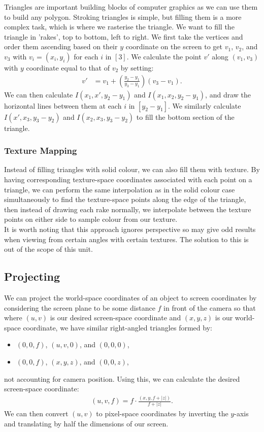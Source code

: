 Triangles are important building blocks of computer graphics as we can use them to build
any polygon. Stroking triangles is simple, but filling them is a more complex task, which
is where we rasterise the triangle.
\newpage
\noindent
We want to fill the triangle in 'rakes', top to bottom, left to right. We first take
the vertices and order them ascending based on their $y$ coordinate on the screen
to get $v_1$, $v_2$, and $v_3$ with $v_i = (x_i, y_i)$ for each $i$ in $[3]$. 
We calculate the point $v'$ along $(v_1, v_3)$ with $y$ coordinate equal to that 
of $v_2$ by setting: \begin{align*}
    v' &= v_1 + \left( \frac{y_2 - y_1}{y_3 - y_1} \right)(v_3 - v_1).
\end{align*} We can then calculate $I(x_1, x', y_2 - y_1)$ and $I(x_1, x_2, y_2 - y_1)$,
and draw the horizontal lines between them at each $i$ in $[y_2 - y_1]$. We similarly
calculate $I(x', x_3, y_3 - y_2)$ and $I(x_2, x_3, y_3 - y_2)$ to fill the bottom
section of the triangle.

\subsubsection{Texture Mapping}

Instead of filling triangles with solid colour, we can also fill them with texture.
By having corresponding texture-space coordinates associated with each point on a
triangle, we can perform the same interpolation as in the solid colour case
simultaneously to find the texture-space points along the edge of the triangle,
then instead of drawing each rake normally, we interpolate between the texture
points on either side to sample colour from our texture.
\\[\baselineskip]
It is worth noting that this approach ignores perspective so may give odd results
when viewing from certain angles with certain textures. The solution to this is
out of the scope of this unit.

\subsection{Projecting}

We can project the world-space coordinates of an object to screen coordinates
by considering the screen plane to be some distance $f$ in front of the
camera so that where $(u, v)$ is our desired screen-space coordinate and $(x, y, z)$ is
our world-space coordinate, we have similar right-angled triangles formed by: 
\begin{itemize}
    \item $(0, 0, f)$, $(u, v, 0)$, and $(0, 0, 0)$,
    \item $(0, 0, f)$, $(x, y, z)$, and $(0, 0, z)$,
\end{itemize} not accounting for camera position.
Using this, we can calculate the desired screen-space coordinate: 
\begin{align*}
    (u, v, f) = f \cdot \frac{(x, y, f + |z|)}{f + |z|}.
\end{align*} We can then convert $(u, v)$ to pixel-space coordinates 
by inverting the $y$-axis
and translating by half the dimensions of our screen.

